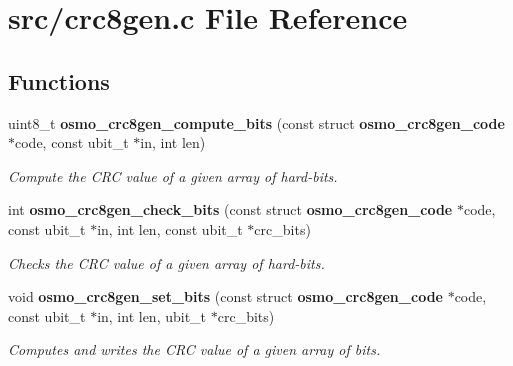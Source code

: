\section{src/crc8gen.c File Reference}
\label{crc8gen_8c}
\subsection*{Functions}
\begin{DoxyCompactItemize}
\item 
uint8\-\_\-t {\bf osmo\-\_\-crc8gen\-\_\-compute\-\_\-bits} (const struct {\bf osmo\-\_\-crc8gen\-\_\-code} $\ast$code, const ubit\-\_\-t $\ast$in, int len)
\begin{DoxyCompactList}\small\item\em Compute the C\-R\-C value of a given array of hard-\/bits. \end{DoxyCompactList}\item 
int {\bf osmo\-\_\-crc8gen\-\_\-check\-\_\-bits} (const struct {\bf osmo\-\_\-crc8gen\-\_\-code} $\ast$code, const ubit\-\_\-t $\ast$in, int len, const ubit\-\_\-t $\ast$crc\-\_\-bits)
\begin{DoxyCompactList}\small\item\em Checks the C\-R\-C value of a given array of hard-\/bits. \end{DoxyCompactList}\item 
void {\bf osmo\-\_\-crc8gen\-\_\-set\-\_\-bits} (const struct {\bf osmo\-\_\-crc8gen\-\_\-code} $\ast$code, const ubit\-\_\-t $\ast$in, int len, ubit\-\_\-t $\ast$crc\-\_\-bits)
\begin{DoxyCompactList}\small\item\em Computes and writes the C\-R\-C value of a given array of bits. \end{DoxyCompactList}\end{DoxyCompactItemize}
